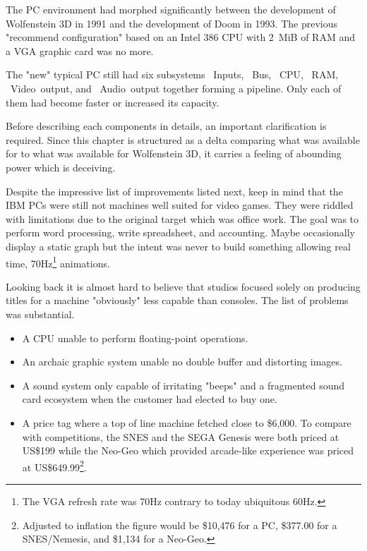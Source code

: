 The PC environment had morphed significantly between the development of Wolfenstein 3D in 1991 and the development of Doom in 1993. The previous "recommend configuration" based on an Intel 386 CPU with 2~MiB of RAM and a VGA graphic card was no more.\\
\par
The "new" typical PC still had six subsystems ~Inputs, ~Bus, ~CPU, ~RAM, ~Video~output, and ~Audio~output together forming a pipeline. Only each of them had become faster or increased its capacity.\\
\par
\vspace{2mm}
\par
 Before describing each components in details, an important clarification is required. Since this chapter is structured as a delta comparing what was available for \doom to what was available for Wolfenstein 3D, it carries a feeling of abounding power which is deceiving. \\
 \par
 Despite the impressive list of improvements listed next, keep in mind that the IBM PCs were still not machines well suited for video games. They were riddled with limitations due to the original target which was office work. The goal was to perform word processing, write spreadsheet, and accounting. Maybe occasionally display a static graph but the intent was never to build something allowing real time, 70Hz\footnote{The VGA refresh rate was 70Hz contrary to today ubiquitous 60Hz.} animations.\\ 
\par 
Looking back it is almost hard to believe that studios focused solely on producing titles for a machine "obviously" less capable than consoles. The list of problems was substantial.
\begin{itemize}
\item A CPU unable to perform floating-point operations.
\item An archaic graphic system unable no double buffer and distorting images.
\item A sound system only capable of irritating "beeps" and a fragmented sound card ecosystem when the customer had elected to buy one.
\item A price tag where a top of line machine fetched close to \$6,000. To compare with competitions, the SNES and the SEGA Genesis were both priced at US\$199 while the Neo-Geo which provided arcade-like experience was priced at US\$649.99\footnote{Adjusted to inflation the figure would be \$10,476 for a PC, \$377.00 for a SNES/Nemesis, and \$1,134 for a Neo-Geo.}.
\end{itemize}

